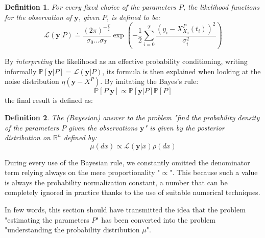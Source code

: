 \documentclass[8pt]{article}
\newtheorem{definition}{Definition}
\begin{document}
\begin{definition}
For every fixed choice of the parameters $P$, the likelihood functions
for the observation of $\textbf{y}$, given $P$, is defined to be:
	\begin{equation}
	\mathcal{L}(\textbf{y}|P) \doteq 
		\frac{(2 \pi)^{- \frac{T}{2}}}
		{\sigma_0\dots\sigma_{T}}
		\exp \left( -\frac{1}{2} 
		\sum_{i=0}^{T} 
		\frac{(y_i - X_{X_0}^P(t_i))^2}
		{\sigma_i^2}
		\right )
	\end{equation}
\end{definition}


By \emph{interpreting} the likelihood as an effective probability
conditioning, writing informally 
$\mathbb{P}[\textbf{y}|P] = \mathcal{L}(\textbf{y}|P)$,
its formula is then explained when looking at the noise
distribution $\eta(\textbf{y} - X^P)$.
By imitating the Bayes's rule:
\begin{equation}
\mathbb{P}[P | \textbf{y}] \propto
	\mathbb{P}[\textbf{y} | P] \mathbb{P}[P]
\end{equation}
the final result is defined as:

\begin{definition}
	The (Bayesian)
	answer to the problem "find the probability density of
	the parameters $P$ given the observations $\textbf{y}$"
	is given by the \emph{posterior}
	distribution on $\mathbb{R}^{n}$ defined by:
	\begin{equation}
		\mu(dx) \propto \mathcal{L}(\textbf{y} | x) \rho(dx)
	\end{equation}
\end{definition}


During every use of the Bayesian rule, we constantly omitted the denominator
term relying always on the mere proportionality "$\propto$". 
This because such a value is always the probability 
normalization constant,
a number that can be completely ignored in practice thanks to the use
of suitable numerical techniques.


In few words, this section should have transmitted the idea that
the problem 
"estimating the parameters $P$" 
has been converted into the problem 
"understanding the probability distribution $\mu$".
\end{document}
